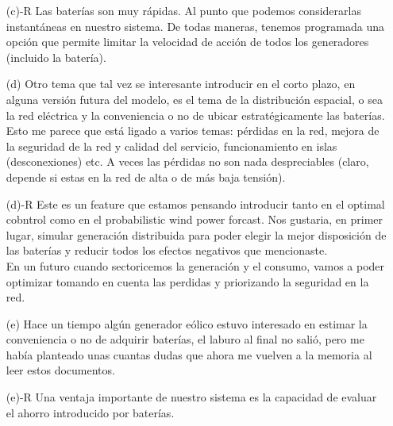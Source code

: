 \documentclass[12pt]{article}
\theoremstyle{definition}
\theoremstyle{remark}
\begin{document}
\begin{enumerate}
\item[(c)-R] Las baterías son muy rápidas. Al punto que podemos considerarlas instantáneas en nuestro sistema. De todas maneras, tenemos programada una opción que permite limitar la velocidad de acción de todos los generadores (incluido la batería).

\item[(d)] Otro tema que tal vez se interesante introducir en el corto plazo, en alguna versión futura del modelo, es el tema de la distribución espacial, o sea la red eléctrica y la conveniencia o no de ubicar estratégicamente las baterías. Esto me parece que está ligado a varios temas: pérdidas en la red, mejora de la seguridad de la red y calidad del servicio, funcionamiento en islas (desconexiones) etc. A veces las pérdidas no son nada despreciables (claro, depende si estas en la red de alta o de más baja tensión).

\item[(d)-R] Este es un feature que estamos pensando introducir tanto en el optimal cobntrol como en el probabilistic wind power forcast. Nos gustaria, en primer lugar, simular generación distribuida para poder elegir la mejor disposición de las baterías y reducir todos los efectos negativos que mencionaste.\\
En un futuro cuando sectoricemos la generación y el consumo, vamos a poder optimizar tomando en cuenta las perdidas y priorizando la seguridad en la red.

\item[(e)] Hace un tiempo algún generador eólico estuvo interesado en estimar la conveniencia o no de adquirir baterías, el laburo al final no salió, pero me había planteado unas cuantas dudas que ahora me vuelven a la memoria al leer estos documentos. 

\item[(e)-R] Una ventaja importante de nuestro sistema es la capacidad de evaluar el ahorro introducido por baterías. 

\end{enumerate}
\end{document}
